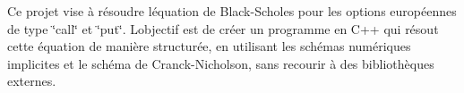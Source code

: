 Ce projet vise à résoudre l\textquotesingle{}équation de Black-\/\+Scholes pour les options européennes de type \char`\"{}call\char`\"{} et \char`\"{}put\char`\"{}. L\textquotesingle{}objectif est de créer un programme en C++ qui résout cette équation de manière structurée, en utilisant les schémas numériques implicites et le schéma de Cranck-\/\+Nicholson, sans recourir à des bibliothèques externes. 